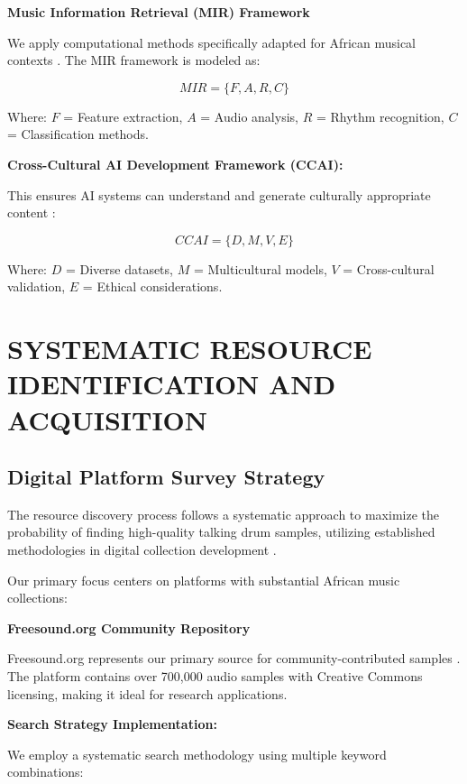 \documentclass[12pt,a4paper]{article}
\begin{document}
\textbf{Music Information Retrieval (MIR) Framework}

We apply computational methods specifically adapted for African musical contexts \citep{rycroft1961guitar, kubik1999africa}. The MIR framework is modeled as:

\begin{equation}
MIR = \{F, A, R, C\}
\end{equation}

Where: $F$ = Feature extraction, $A$ = Audio analysis, $R$ = Rhythm recognition, $C$ = Classification methods.

\textbf{Cross-Cultural AI Development Framework (CCAI):}

This ensures AI systems can understand and generate culturally appropriate content \citep{barocas2017fairness, liang2022holistic}:

\begin{equation}
CCAI = \{D, M, V, E\}
\end{equation}

Where: $D$ = Diverse datasets, $M$ = Multicultural models, $V$ = Cross-cultural validation, $E$ = Ethical considerations.

\section{SYSTEMATIC RESOURCE IDENTIFICATION AND ACQUISITION}

\subsection{Digital Platform Survey Strategy}

The resource discovery process follows a systematic approach to maximize the probability of finding high-quality talking drum samples, utilizing established methodologies in digital collection development \citep{lee2002collection, johnson2018fundamentals}.

Our primary focus centers on platforms with substantial African music collections:

\textbf{Freesound.org Community Repository}

Freesound.org represents our primary source for community-contributed samples \citep{font2013freesound}. The platform contains over 700,000 audio samples with Creative Commons licensing, making it ideal for research applications.

\textbf{Search Strategy Implementation:}

We employ a systematic search methodology using multiple keyword combinations:
\end{document}
